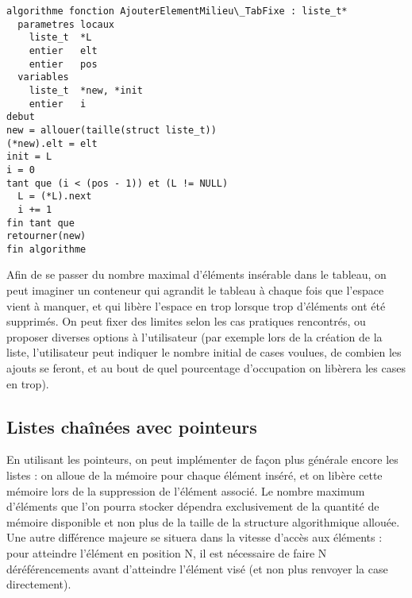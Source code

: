 \documentclass[11pt,a4paper]{article}
\begin{document}
\begin{center}
\begin{lstlisting}[style=algorithmique]
algorithme fonction AjouterElementMilieu\_TabFixe : liste_t*
  parametres locaux
    liste_t  *L
    entier   elt
    entier   pos
  variables
    liste_t  *new, *init
    entier   i
debut
new = allouer(taille(struct liste_t))
(*new).elt = elt
init = L
i = 0
tant que (i < (pos - 1)) et (L != NULL)
  L = (*L).next
  i += 1
fin tant que
retourner(new)
fin algorithme \end{lstlisting}
\end{center}


\bigskip

Afin de se passer du nombre maximal d'éléments insérable dans le tableau, on peut imaginer un conteneur qui agrandit le tableau à chaque fois que l'espace vient à manquer, et qui libère l'espace en trop lorsque trop d'éléments ont été supprimés.
On peut fixer des limites selon les cas pratiques rencontrés, ou proposer diverses options à l'utilisateur (par exemple lors de la création de la liste, l'utilisateur peut indiquer le nombre initial de cases voulues, de combien les ajouts se feront, et au bout de quel pourcentage d'occupation on libèrera les cases en trop).

\bigskip



\bigskip


\subsection{Listes chaînées avec pointeurs}

\bigskip

En utilisant les pointeurs, on peut implémenter de façon plus générale encore les listes : on alloue de la mémoire pour chaque élément inséré, et on libère cette mémoire lors de la suppression de l'élément associé.
Le nombre maximum d'éléments que l'on pourra stocker dépendra exclusivement de la quantité de mémoire disponible et non plus de la taille de la structure algorithmique allouée.
Une autre différence majeure se situera dans la vitesse d'accès aux éléments : pour atteindre l'élément en position N, il est nécessaire de faire N déréférencements avant d'atteindre l'élément visé (et non plus renvoyer la case directement).
\end{document}
